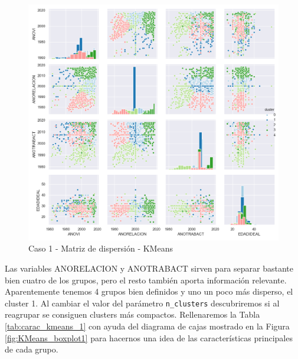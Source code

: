 \documentclass[a4paper, 20pt]{article}
\begin{document}
\begin{figure}[H]
    \centering
    \includegraphics[width=1\textwidth]{./caso1/KMeans_scattermatrix}
    \caption{Caso 1 - Matriz de dispersión - KMeans}
    \label{fig:KMeans_scatter1}
\end{figure}

Las variables ANORELACION y ANOTRABACT sirven para separar bastante bien cuatro de los grupos, pero el resto también aporta información relevante. Aparentemente tenemos 4 grupos bien definidos y uno un poco más disperso, el cluster 1. Al cambiar el valor del parámetro \texttt{n\_clusters} descubriremos si al reagrupar se consiguen clusters más compactos. Rellenaremos la Tabla \ref{tab:carac_kmeans_1} con ayuda del diagrama de cajas mostrado en la Figura \ref{fig:KMeans_boxplot1} para hacernos una idea de las características principales de cada grupo.
\end{document}
